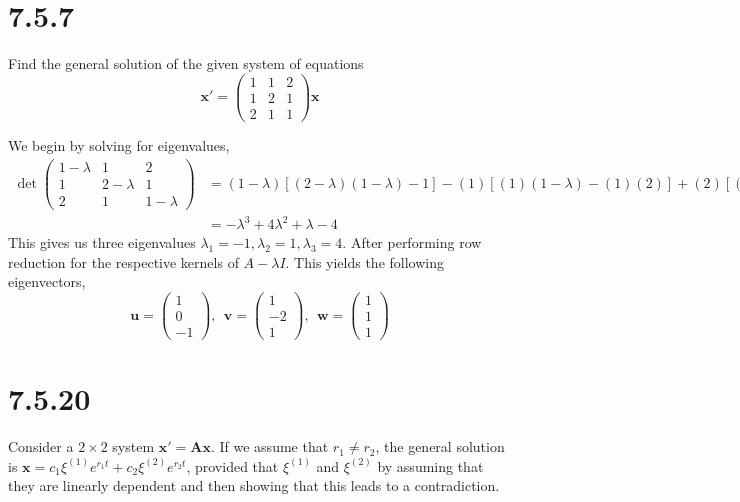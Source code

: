 \documentclass{article}
\theoremstyle{definition}
\begin{document}
\section*{7.5.7}
    \begin{mdframed}[]
        Find the general solution  of the given system of equations
        \[
            \bm x' = \begin{pmatrix}
                1 & 1 & 2 \\
                1 & 2 & 1 \\
                2 & 1 & 1
            \end{pmatrix} \bm x
        \]
    \end{mdframed}
    We begin by solving for eigenvalues,
    \begin{align*}
        \det\begin{pmatrix}
            1 - \lambda & 1 & 2 \\
            1 & 2 - \lambda & 1 \\
            2 & 1 & 1 - \lambda
        \end{pmatrix} & = (1 - \lambda)[(2 - \lambda)(1 - \lambda) - 1] - (1)[(1)(1 - \lambda) - (1)(2)] + (2)[(1)(1) - (2)(2 - \lambda)] \\
        & = -\lambda^3 + 4\lambda^2 + \lambda - 4
    \end{align*}
    This gives us three eigenvalues $\lambda_1 = -1, \lambda_2 = 1, \lambda_3 = 4$.
    After performing row reduction for the respective kernels of $A - \lambda I$.
    This yields the following eigenvectors,
    \[
        \bm u = \begin{pmatrix}
            1 \\ 0 \\ -1
        \end{pmatrix}, \ \ \bm v = \begin{pmatrix}
            1 \\ -2 \\ 1
        \end{pmatrix}, \ \ \bm w = \begin{pmatrix}
            1 \\ 1 \\ 1
        \end{pmatrix}
    \]
\section*{7.5.20}
    Consider a $2 \times 2$ system $\bm x ' = \bm{Ax}$. If we assume
    that $r_1 \neq r_2$, the general solution is $\bm x = c_1 \xi^{(1)}e^{r_1t} + c_2 \xi^{(2)}e^{r_2t}$,
    provided that $\xi^{(1)}$ and $\xi^{(2)}$ by assuming that they are
    linearly dependent and then showing that this leads to a contradiction.
\end{document}
